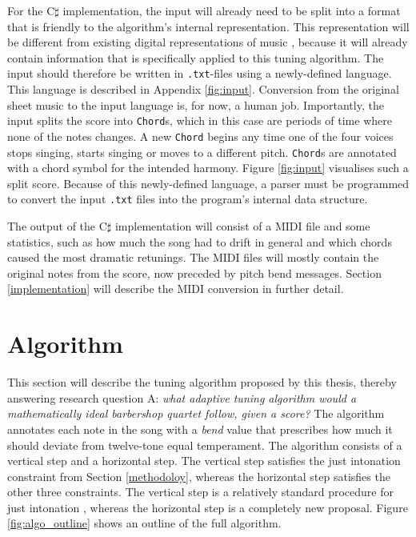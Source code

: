 \documentclass[a4paper]{article}
\begin{document}
For the C$\sharp$ implementation, the input will already need to be split into a format that is friendly to the algorithm's internal representation. This representation will be different from existing digital representations of music \cite{midi_manufacturers_association_complete_2014, de_haas_music_2012, hsiao_compound_2021}, because it will already contain information that is specifically applied to this tuning algorithm. The input should therefore be written in \texttt{.txt}-files using a newly-defined language. This language is described in Appendix \ref{fig:input}. Conversion from the original sheet music to the input language is, for now, a human job. Importantly, the input splits the score into \texttt{Chord}s, which in this case are periods of time where none of the notes changes. A new \texttt{Chord} begins any time one of the four voices stops singing, starts singing or moves to a different pitch. \texttt{Chord}s are annotated with a chord symbol for the intended harmony. Figure \ref{fig:input} visualises such a split score. Because of this newly-defined language, a parser must be programmed to convert the input \texttt{.txt} files into the program's internal data structure.

The output of the C$\sharp$ implementation will consist of a MIDI file \cite{midi_manufacturers_association_complete_2014} and some statistics, such as how much the song had to drift in general and which chords caused the most dramatic retunings. The MIDI files will mostly contain the original notes from the score, now preceded by pitch bend messages. Section \ref{implementation} will describe the MIDI conversion in further detail.

\section{Algorithm}
\label{algorithm}
This section will describe the tuning algorithm proposed by this thesis, thereby answering research question A: {\it what adaptive tuning algorithm would a mathematically ideal barbershop quartet follow, given a score?} The algorithm annotates each note in the song with a \textit{bend} value that prescribes how much it should deviate from twelve-tone equal temperament. The algorithm consists of a vertical step and a horizontal step. The vertical step satisfies the just intonation constraint from Section \ref{methodoloy}, whereas the horizontal step satisfies the other three constraints. The vertical step is a relatively standard procedure for just intonation \cite{mohrlok_hermode_2003, volkov_pivotuner_2022}, whereas the horizontal step is a completely new proposal. Figure \ref{fig:algo_outline} shows an outline of the full algorithm.
\end{document}
